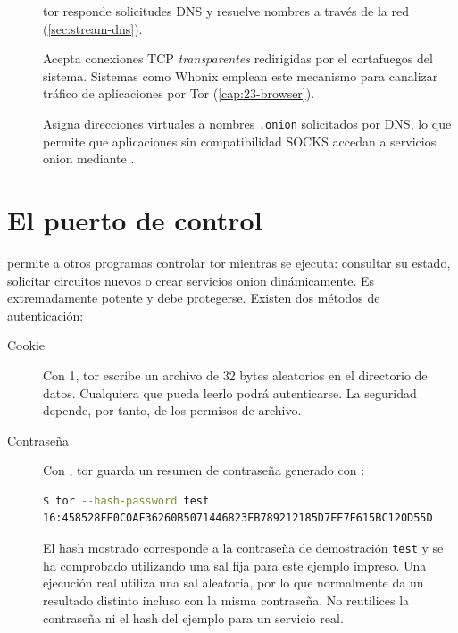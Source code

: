 \begin{description}
  \item[] tor responde solicitudes DNS y resuelve nombres a través de la red (\cref{sec:stream-dns}).
  \item[] Acepta conexiones TCP \emph{transparentes} redirigidas por el cortafuegos del sistema. Sistemas como Whonix emplean este mecanismo para canalizar tráfico de aplicaciones por Tor (\cref{cap:23-browser}).
  \item[] Asigna direcciones virtuales a nombres \texttt{.onion} solicitados por DNS, lo que permite que aplicaciones sin compatibilidad SOCKS accedan a servicios onion mediante .
\end{description}

\section{El puerto de control}\label{sec:torrc-controllo}

 permite a otros programas controlar tor mientras se ejecuta: consultar su estado, solicitar circuitos nuevos o crear servicios onion dinámicamente. Es extremadamente potente y debe protegerse. Existen dos métodos de autenticación:
\begin{description}
  \item[Cookie] Con  1, tor escribe un archivo de 32 bytes aleatorios en el directorio de datos. Cualquiera que pueda leerlo podrá autenticarse. La seguridad depende, por tanto, de los permisos de archivo.
  \item[Contraseña] Con , tor guarda un resumen de contraseña generado con :
\begin{lstlisting}[language=bash,numbers=none]
$ tor --hash-password test
16:458528FE0C0AF36260B5071446823FB789212185D7EE7F615BC120D55D
\end{lstlisting}
El hash mostrado corresponde a la contraseña de demostración \texttt{test} y se ha comprobado utilizando una sal fija para este ejemplo impreso. Una ejecución real utiliza una sal aleatoria, por lo que normalmente da un resultado distinto incluso con la misma contraseña. No reutilices la contraseña ni el hash del ejemplo para un servicio real.
\end{description}

